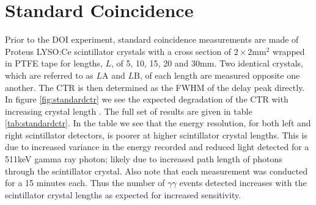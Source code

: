 \section{Standard Coincidence}
\label{sec:standardctr}
Prior to the DOI experiment, standard coincidence measurements are made of Proteus LYSO:Ce scintillator crystals with a cross section of $2\times2$mm$^2$ wrapped in PTFE tape for lengths, $L$, of 5, 10, 15, 20 and 30mm. Two identical crystals, which are referred to as $L\text{A}$ and $L\text{B}$, of each length are measured opposite one another. The CTR is then determined as the FWHM of the delay peak directly. In figure \ref{fig:standardctr} we see the expected degradation of the CTR with increasing crystal length \cite{r_Paganoni_Pauwels_et_al__2011}\cite{Wiener_Kaul_Surti_Karp_2010}\cite{Choong_2009}\cite{Gola_Piemonte_Tarolli_2013}\cite{o_Pro_Serra_Tarolli_Zorzi_2011}. The full set of results are given in table \ref{tab:standardctr}. In the table we see that the energy resolution, for both left and right scintillator detectors, is poorer at higher scintillator crystal lengths. This is due to increased variance in the energy recorded and reduced light detected for a 511keV gamma ray photon; likely due to increased path length of photons through the scintillator crystal. Also note that each measurement was conducted for a 15 minutes each. Thus the number of $\gamma\gamma$ events detected increases with the scintillator crystal lengths as expected for increased sensitivity.